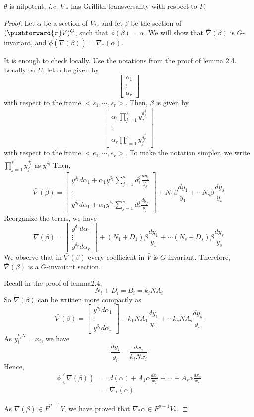 \documentclass{article}
\begin{document}
\begin{lemma}
$\theta$ is nilpotent, \emph{i.e.} $\nabla_*$ has Griffith transversality with respect to $F$.
\end{lemma}
\begin{proof}
Let $\alpha$ be a section of $V_*$, and let $\beta$ be the section of $(\pushforward{\pi}\bar{V})^G$,
such that $\phi(\beta) = \alpha$. We will show that $\bar{\nabla}(\beta)$ is $G$-invariant,
and $\phi(\bar{\nabla}(\beta)) = \nabla_*(\alpha)$.

\renewcommand{\vector}[2]{
    \left[\begin{array}{c}
            {#1}\\
            {\vdots}\\
            {#2}
        \end{array}\right]
}
It is enough to check locally. Use the notations from the proof of lemma 2.4. Locally on $U$, let
$\alpha$ be given by 
\[
    \vector{\alpha_1}{\alpha_r}
\]
with respect to the frame $<s_1, \cdots, s_r>$. Then, $\beta$ is given by
\[
    \vector{\alpha_1\prod\limits_{j=1}^sy_j^{d^j_1}}{\alpha_r\prod\limits_{j=1}^sy_j^{d^j_r}}
\]
with respect to the frame $<e_1,\cdots,e_r>$.
To make the notation simpler, we write $\prod\limits_{j=1}^sy_j^{d^j_i}$ as $y^{\delta_i}$ 
Then,
\[
    \bar{\nabla}(\beta) = \vector{y^{\delta_1}d\alpha_1 + \alpha_1 y^{\delta_1}\sum\limits_{j=1}^sd^j_1\frac{dy_j}{y_j}}
                          {y^{\delta_r}d\alpha_1 + \alpha_1 y^{\delta_r}\sum\limits_{j=1}^sd^j_r\frac{dy_j}{y_j}}
    + N_1\beta\frac{dy_1}{y_1} + \cdots N_s\beta\frac{dy_s}{y_s}
\]
Reorganize the terms, we have
\[
    \bar{\nabla}(\beta) = \vector{y^{\delta_1}d\alpha_1}{y^{\delta_r}d\alpha_r}
        + (N_1 + D_1)\beta\frac{dy_1}{y_1} + \cdots (N_s + D_s)\beta\frac{dy_s}{y_s}
\]
We observe that in $\bar{\nabla}(\beta)$ every coefficient in $\bar{V}$ is $G$-invariant. 
Therefore, $\bar{\nabla}(\beta)$ is a $G$-invariant section. 

Recall in the proof of lemma2.4, 
\[
    N_i + D_i = B_i = k_iNA_i
\]
So $\bar{\nabla}(\beta)$ can be written more compactly as
\[
    \bar{\nabla}(\beta) = \vector{y^{\delta_1}d\alpha_1}{y^{\delta_r}d\alpha_r} 
        + k_1NA_1\frac{dy_1}{y_1} + \cdots k_sNA_s\frac{dy_s}{y_s}
\]
As $y^{k_iN}_i = x_i$, we have
\[
    \frac{dy_i}{y_i} = \frac{dx_i}{k_iNx_i}
\]
Hence, 
\begin{align*}
    \phi(\bar{\nabla}(\beta)) & = d(\alpha) + A_1\alpha\frac{dx_1}{x_1} + \cdots  + A_s\alpha\frac{dx_s}{x_s} \\
                              & = \nabla_*(\alpha)
\end{align*}

As $\bar{\nabla}(\beta) \in \bar{F}^{p-1}\bar{V}$, we have proved that $\nabla_*{\alpha} \in F^{p-1}V_*$. 


\end{proof}
\end{document}
